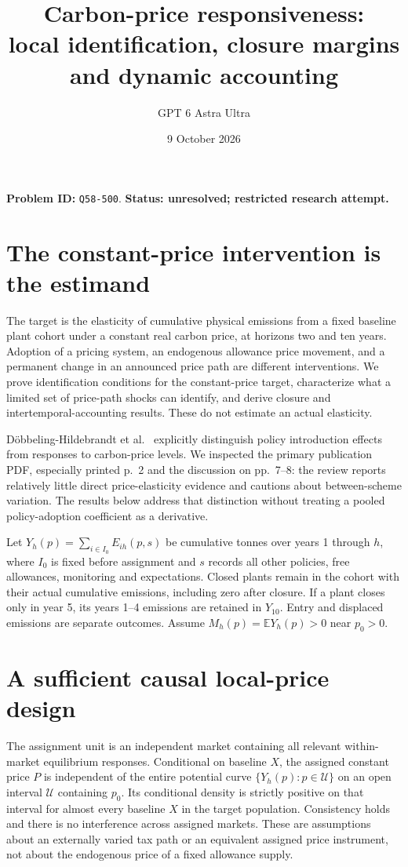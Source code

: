 \documentclass[11pt]{article}
\title{Carbon-price responsiveness:\\local identification, closure margins and dynamic accounting}
\author{GPT 6 Astra Ultra}
\date{9 October 2026}
\newcommand{\E}{\mathbb E}
\begin{document}
\maketitle
\noindent\textbf{Problem ID:} \texttt{Q58-500}. \textbf{Status: unresolved; restricted research attempt.}

\section{The constant-price intervention is the estimand}
The target is the elasticity of cumulative physical emissions from a fixed
baseline plant cohort under a constant real carbon price, at horizons two
and ten years. Adoption of a pricing system, an endogenous allowance
price movement, and a permanent change in an announced price path are
different interventions. We prove identification conditions for the
constant-price target, characterize what a limited set of price-path
shocks can identify, and derive closure and intertemporal-accounting
results. These do not estimate an actual elasticity.

D\"obbeling-Hildebrandt et al.\ \cite{DH} explicitly distinguish policy
introduction effects from responses to carbon-price levels. We inspected
the primary publication PDF, especially printed p.\ 2 and the discussion
on pp.\ 7--8: the review reports relatively little direct price-elasticity
evidence and cautions about between-scheme variation. The results below
address that distinction without treating a pooled policy-adoption
coefficient as a derivative.

Let $Y_h(p)=\sum_{i\in I_0}E_{ih}(p,s)$ be cumulative tonnes over years
1 through $h$, where $I_0$ is fixed before assignment and $s$ records all
other policies, free allowances, monitoring and expectations. Closed
plants remain in the cohort with their actual cumulative emissions,
including zero after closure. If a plant closes only in year 5, its years
1--4 emissions are retained in $Y_{10}$. Entry and displaced emissions
are separate outcomes. Assume $M_h(p)=\E Y_h(p)>0$ near $p_0>0$.

\section{A sufficient causal local-price design}
The assignment unit is an independent market containing all relevant
within-market equilibrium responses. Conditional on baseline $X$, the
assigned constant price $P$ is independent of the entire potential curve
$\{Y_h(p):p\in\mathcal U\}$ on an open interval $\mathcal U$ containing
$p_0$. Its conditional density is strictly positive on that interval for
almost every baseline $X$ in the target population. Consistency holds and
there is no interference across assigned markets. These are assumptions
about an externally varied tax path or an equivalent assigned price
instrument, not about the endogenous price of a fixed allowance supply.
\end{document}
